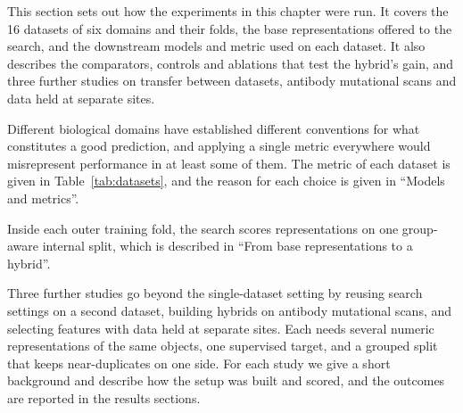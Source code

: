 This section sets out how the experiments in this chapter were run. It covers the 16 datasets of six domains and their folds, the base representations offered to the search, and the downstream models and metric used on each dataset. It also describes the comparators, controls and ablations that test the hybrid's gain, and three further studies on transfer between datasets, antibody mutational scans and data held at separate sites.

Different biological domains have established different conventions for what constitutes a good prediction, and applying a single metric everywhere would misrepresent performance in at least some of them. The metric of each dataset is given in Table~\ref{tab:datasets}, and the reason for each choice is given in ``Models and metrics''.

Inside each outer training fold, the search scores representations on one group-aware internal split, which is described in ``From base representations to a hybrid''.

Three further studies go beyond the single-dataset setting by reusing search settings on a second dataset, building hybrids on antibody mutational scans, and selecting features with data held at separate sites. Each needs several numeric representations of the same objects, one supervised target, and a grouped split that keeps near-duplicates on one side. For each study we give a short background and describe how the setup was built and scored, and the outcomes are reported in the results sections.
